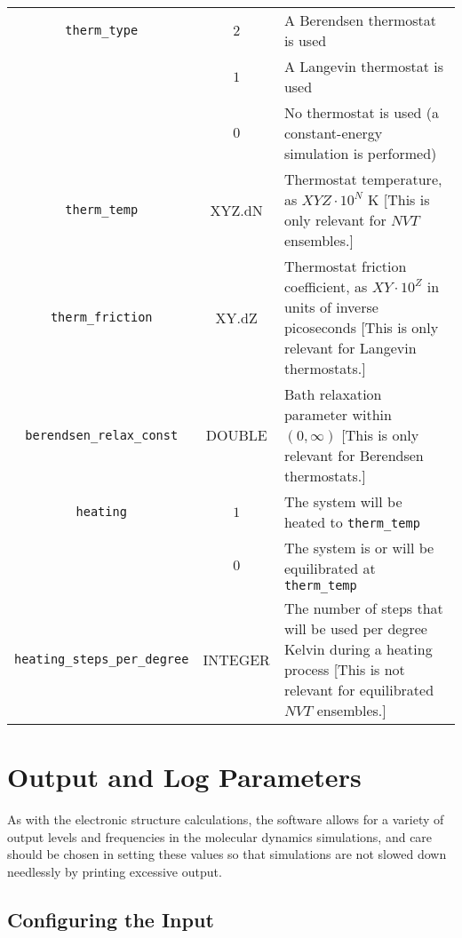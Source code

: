 \documentclass[12pt,letter,footinclude=true,headinclude=true,hyphens]{book} %
\begin{document}
    \begin{tabular}{ | c | c | p{7cm} | }
    \hline
    \texttt{therm\_type} & $2$ & A Berendsen thermostat is used \\
    & $1$ & A Langevin thermostat is used \\
    & $0$ & No thermostat is used (a constant-energy simulation is performed) \\ \hline
    \texttt{therm\_temp} & XYZ.dN & Thermostat temperature, as $XYZ \cdot 10^N$ K [This is only relevant for $NVT$ ensembles.]\\ \hline
    \texttt{therm\_friction} & XY.dZ & Thermostat friction coefficient, as $XY \cdot 10^Z$ in units of inverse picoseconds [This is only relevant for Langevin thermostats.] \\ \hline
    \texttt{berendsen\_relax\_const} & DOUBLE & Bath relaxation parameter within $(0, \infty)$ [This is only relevant for Berendsen thermostats.] \\ \hline
    \texttt{heating} & $1$ & The system will be heated to \texttt{therm\_temp} \\
    & $0$ & The system is or will be equilibrated at \texttt{therm\_temp}\\ \hline
    \texttt{heating\_steps\_per\_degree} & INTEGER & The number of steps that will be used per degree Kelvin during a heating process [This is not relevant for equilibrated $NVT$ ensembles.] \\ \hline
    \end{tabular}
    
    \section{Output and Log Parameters}
    
    As with the electronic structure calculations, the software allows for a variety of output levels and frequencies in the molecular dynamics simulations, and care should be chosen in setting these values so that simulations are not slowed down needlessly by printing excessive output.
    
    \subsection{Configuring the Input}
    \label{output-log-input}
    
\end{document}
